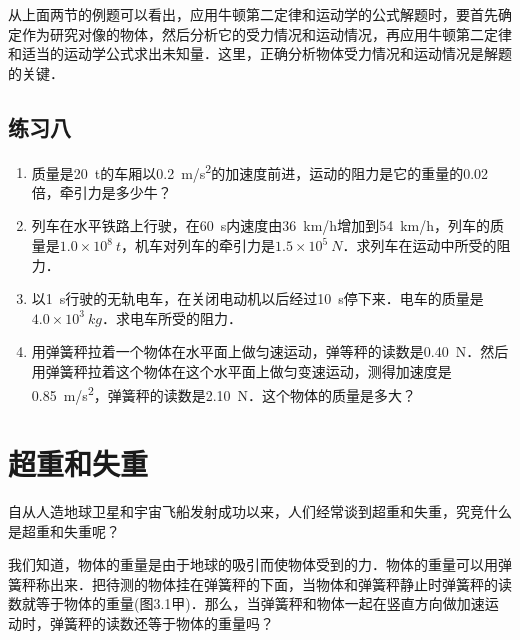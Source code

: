 从上面两节的例题可以看出，应用牛顿第二定律和运动学的公式解题时，要首先确定作为研究对像的物体，然后分析它的受力情况和运动情况，再应用牛顿第二定律和适当的运动学公式求出未知量．这里，正确分析物体受力情况和运动情况是解题的关键．

\subsection*{练习八}
\begin{enumerate}
    \item 质量是\SI{20}{t}的车厢以\SI{0.2}{m/s^2}的加速度前进，运动的阻力是它的重量的0.02倍，牵引力是多少牛？
    \item  列车在水平铁路上行驶，在\SI{60}{s}内速度由\SI{36}{km/h}增加到\SI{54}{km/h}，列车的质量是$1.0\times 10^8~\si{t}$，机车对列车的牵引力是$1.5\times 10^5~\si{N}$．求列车在运动中所受的阻力．
    \item  以\SI{1}{s}行驶的无轨电车，在关闭电动机以后经过\SI{10}{s}停下来．电车的质量是$4.0\times 10^3~\si{kg}$．求电车所受的阻力．
    \item  用弹簧秤拉着一个物体在水平面上做匀速运动，弹等秤的读数是\SI{0.40}{N}．然后用弹簧秤拉着这个物体在这个水平面上做匀变速运动，测得加速度是\SI{0.85}{m/s^2}，弹簧秤的读数是\SI{2.10}{N}．这个物体的质量是多大？
\end{enumerate}
\newpage
\section{超重和失重}
自从人造地球卫星和宇宙飞船发射成功以来，人们经常谈到超重和失重，究竞什么是超重和失重呢？

我们知道，物体的重量是由于地球的吸引而使物体受到的力．物体的重量可以用弹簧秤称出来．把待测的物体挂在弹簧秤的下面，当物体和弹簧秤静止时弹簧秤的读数就等于物体的重量(图3.1甲)．那么，当弹簧秤和物体一起在竖直方向做加速运动时，弹簧秤的读数还等于物体的重量吗？

